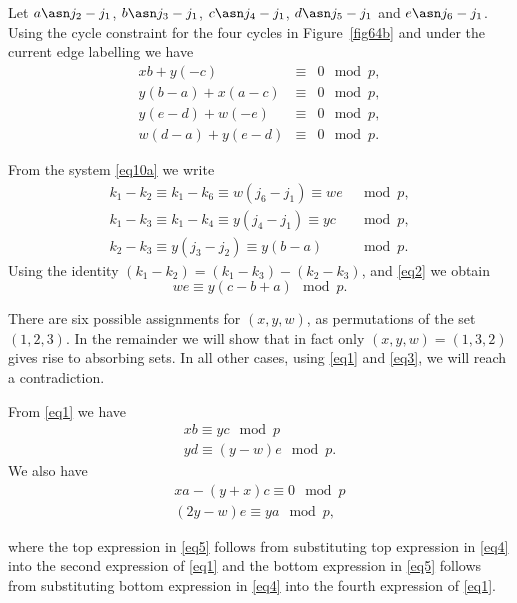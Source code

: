 Let $a\asn j_2-j_1$, $b\asn j_3-j_1$, $c\asn j_4-j_1$, $d\asn
j_5-j_1$ and $e\asn j_6-j_1$. Using the cycle constraint for the
four cycles in Figure~\ref{fig64b} and under the current edge
labelling we have
\begin{equation}\label{eq1}\begin{array}{cccc}
xb+y(-c) &\equiv &0 \mod p, \\
y(b-a)+x(a-c) &\equiv &0 \mod p, \\
y(e-d) +w(-e) &\equiv &0 \mod p, \\
w(d-a)+y(e-d)&\equiv &0 \mod p .\end{array}\end{equation}

From the system \eqref{eq10a} we write
\begin{equation}\label{eq2}\begin{array}{lll}
k_1 -k_2 \equiv k_1-k_6 \equiv w(j_6-j_1) \equiv we &\mod p,\\
k_1-k_3 \equiv k_1 -k_4 \equiv y(j_4-j_1) \equiv yc &\mod p,\\
k_2 -k_3 \equiv y(j_3-j_2) \equiv y(b-a) &\mod p.
\end{array}\end{equation}
Using the identity $(k_1-k_2)=(k_1-k_3)-(k_2-k_3)$, and
\eqref{eq2} we obtain
\begin{equation}\label{eq3}
we \equiv y(c-b+a) \mod p.
\end{equation}

There are six possible assignments for $(x,y,w)$, as permutations
of the set $(1,2,3)$. In the remainder we will show that in fact
only $(x,y,w)=(1,3,2)$ gives rise to absorbing sets. In all other
cases, using \eqref{eq1} and \eqref{eq3}, we will reach a
contradiction.

From \eqref{eq1} we have
\begin{equation}\label{eq4}\begin{array}{ccc}
xb \equiv yc \mod p\\
yd \equiv (y-w)e \mod p.
\end{array}\end{equation}
We also have
\begin{equation}\label{eq5}\begin{array}{ccc}
xa -(y+x)c \equiv 0 \mod p\\
(2y-w)e \equiv ya \mod p,
\end{array}\end{equation}

where the top expression in \eqref{eq5} follows from substituting
top expression in \eqref{eq4} into the second expression of
\eqref{eq1} and the bottom expression in \eqref{eq5} follows from
substituting bottom expression in \eqref{eq4} into the fourth
expression of \eqref{eq1}.

